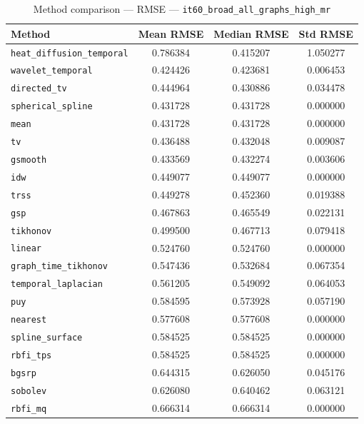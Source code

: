 \begin{table}[ht]
\centering
\caption{Method comparison — RMSE — \texttt{it60_broad_all_graphs_high_mr}}
\label{tab:rmse_it60_broad_all_graphs_high_mr}
\begin{tabular}{lccc}
\hline
Method & Mean RMSE & Median RMSE & Std RMSE \\
\hline
\texttt{heat_diffusion_temporal} & 0.786384 & 0.415207 & 1.050277 \\
\texttt{wavelet_temporal} & 0.424426 & 0.423681 & 0.006453 \\
\texttt{directed_tv} & 0.444964 & 0.430886 & 0.034478 \\
\texttt{spherical_spline} & 0.431728 & 0.431728 & 0.000000 \\
\texttt{mean} & 0.431728 & 0.431728 & 0.000000 \\
\texttt{tv} & 0.436488 & 0.432048 & 0.009087 \\
\texttt{gsmooth} & 0.433569 & 0.432274 & 0.003606 \\
\texttt{idw} & 0.449077 & 0.449077 & 0.000000 \\
\texttt{trss} & 0.449278 & 0.452360 & 0.019388 \\
\texttt{gsp} & 0.467863 & 0.465549 & 0.022131 \\
\texttt{tikhonov} & 0.499500 & 0.467713 & 0.079418 \\
\texttt{linear} & 0.524760 & 0.524760 & 0.000000 \\
\texttt{graph_time_tikhonov} & 0.547436 & 0.532684 & 0.067354 \\
\texttt{temporal_laplacian} & 0.561205 & 0.549092 & 0.064053 \\
\texttt{puy} & 0.584595 & 0.573928 & 0.057190 \\
\texttt{nearest} & 0.577608 & 0.577608 & 0.000000 \\
\texttt{spline_surface} & 0.584525 & 0.584525 & 0.000000 \\
\texttt{rbfi_tps} & 0.584525 & 0.584525 & 0.000000 \\
\texttt{bgsrp} & 0.644315 & 0.626050 & 0.045176 \\
\texttt{sobolev} & 0.626080 & 0.640462 & 0.063121 \\
\texttt{rbfi_mq} & 0.666314 & 0.666314 & 0.000000 \\
\hline
\end{tabular}
\end{table}
